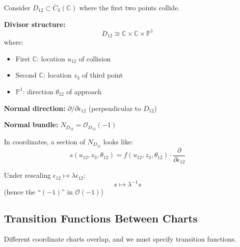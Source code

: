\begin{example}\label{ex:normal-bundle-d12}
Consider $D_{12} \subset \overline{C}_3(\mathbb{C})$ where the first two points collide.

\textbf{Divisor structure:}
$$D_{12} \cong \mathbb{C} \times \mathbb{C} \times \mathbb{P}^1$$
where:
\begin{itemize}
\item First $\mathbb{C}$: location $u_{12}$ of collision
\item Second $\mathbb{C}$: location $z_3$ of third point
\item $\mathbb{P}^1$: direction $\theta_{12}$ of approach
\end{itemize}

\textbf{Normal direction:} $\partial/\partial \epsilon_{12}$ (perpendicular to $D_{12}$)

\textbf{Normal bundle:} $N_{D_{12}} = \mathcal{O}_{D_{12}}(-1)$

In coordinates, a section of $N_{D_{12}}$ looks like:
$$s(u_{12}, z_3, \theta_{12}) = f(u_{12}, z_3, \theta_{12}) \cdot \frac{\partial}{\partial \epsilon_{12}}$$

Under rescaling $\epsilon_{12} \mapsto \lambda \epsilon_{12}$:
$$s \mapsto \lambda^{-1} s$$
(hence the ``$(-1)$'' in $\mathcal{O}(-1)$)
\end{example}

\subsection{Transition Functions Between Charts}

Different coordinate charts overlap, and we must specify transition functions.

